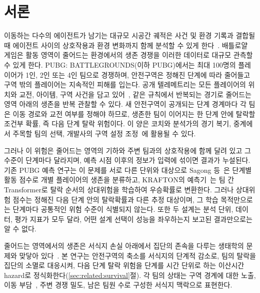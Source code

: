 \section{서론}
\label{sec:introduction}

이동하는 다수의 에이전트가 남기는 대규모 시공간 궤적은 사건 및 환경 기록과 결합될 때 에이전트 사이의 상호작용과 환경 변화까지 함께 분석할 수 있게 한다~\cite{Zheng15}.
배틀로얄 게임은 활동 영역이 줄어드는 환경에서의 생존 경쟁을 이러한 데이터로 대규모 관측할 수 있게 한다.
PUBG: BATTLEGROUNDS(이하 PUBG)에서는 최대 100명의 플레이어가 1인, 2인 또는 4인 팀으로 경쟁하며, 안전구역은 정해진 단계에 따라 줄어들고 구역 밖의 플레이어는 지속적인 피해를 입는다.
공개 텔레메트리는 모든 플레이어의 위치와 교전, 아이템, 구역 사건을 담고 있어~\cite{PUBGAPI}, 같은 규칙에서 반복되는 경기로 줄어드는 영역 아래의 생존을 반복 관찰할 수 있다.
새 안전구역이 공개되는 단계 경계마다 각 팀은 이동 경로와 교전 여부를 정해야 하므로,  생존한 팀이 이어지는 한 단계 안에 탈락할 조건부 확률, 즉 다음 단계 탈락 위험이다.
이 양은 코치와 분석가의 경기 복기, 중계에서 주목할 팀의 선택, 개발사의 구역 설정 조정~\cite{PUBGBlueZone2026}에 활용될 수 있다.

그러나 이 위험은 줄어드는 영역의 기하와 주변 팀과의 상호작용에 함께 달려 있고 그 수준이 단계마다 달라지며, 예측 시점 이후의 정보가 입력에 섞이면 결과가 누설된다.
기존 PUBG 예측 연구는 이 문제를 서로 다른 단위와 대상으로  Sagong 등~\cite{Sagong25a,Sagong25b}은 단계별 활동 점수로 개별 플레이어의 생존을 분류하고, KRAFTON의 예측기~\cite{KRAFTON}는 팀 간 Transformer로 탈락 순서의 상대위험을 학습하여 우승확률로 변환한다.
그러나 상대위험 점수는 정해진 다음 단계 안의 탈락확률과 다른 추정 대상이며, 그 학습 목적만으로는 단계마다 공통적인 위험 수준이 식별되지 않는다.
또한 두 설계는 분석 단위, 데이터, 평가 지표가 모두 달라, 어떤 설계 선택이 성능을 좌우하는지 보고된 결과만으로는 알 수 없다.

줄어드는 영역에서의 생존은 서식지 손실 아래에서 집단의 존속을 다루는 생태학의 문제와 맞닿아 있다~\cite{Fahrig03}.
본 연구는 안전구역의 축소를 서식지의 단계적 감소로, 팀의 탈락을 집단의 소멸로 대응시켜, 다음 단계 탈락 위험을 단계를 시간 단위로 하는 이산시간 hazard로 정식화한다(\ref{sec:related:survival}절).
각 팀의 상태는 구역 경계에 대한 노출, 이동 부담~\cite{Nathan08}, 주변 경쟁 밀도, 남은 팀원 수로 구성한 서식지 맥락으로 표현한다.

